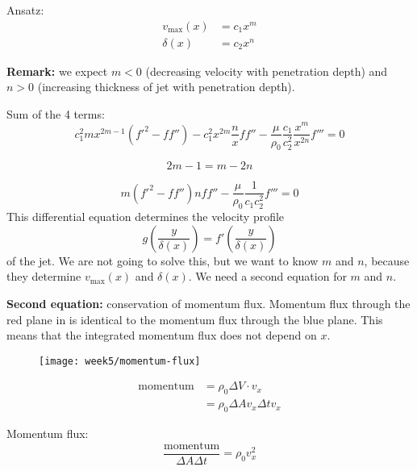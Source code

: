 Ansatz:
\begin{align}
v_\mathrm{max}(x) &= c_1x^m\\
\delta(x) &= c_2 x^n
\end{align}

\begin{framed}
\textbf{Remark:} we expect $m<0$ (decreasing velocity with penetration depth) and $n>0$ (increasing thickness of jet with penetration depth).
\end{framed}

Sum of the 4 terms:
\begin{equation}
c_1^2mx^{2m-1}(f'^2-ff'')-c_1^2x^{2m}\frac{n}{x}ff'' - \frac{\mu}{\rho_0}\frac{c_1}{c_2^2}\frac{x^m}{x^{2n}}f'''=0
\end{equation}

\begin{equation}
2m-1 = m-2n
\end{equation}

\begin{equation}
m(f'^2-ff'')nff''-\frac{\mu}{\rho_0}\frac{1}{c_1c_2^2}f'''=0
\end{equation}
This differential equation determines the velocity profile
\begin{equation}
g\left(\frac{y}{\delta(x)}\right)=f'\left(\frac{y}{\delta(x)}\right)
\end{equation}
of the jet. We are not going to solve this, but we want to know $m$ and $n$, because they determine $v_\mathrm{max}(x)$ and $\delta(x)$. We need a second equation for $m$ and $n$.

\textbf{Second equation:} conservation of momentum flux.
Momentum flux through the red plane in  is identical to the momentum flux through the blue plane. This means that the integrated momentum flux does not depend on $x$.
\begin{figure}[!h]
    \centering
    \texttt{[image: week5/momentum-flux]}\\
    \caption{}
    \label{fig:momentum-flux}
\end{figure}

\begin{align}
\mathrm{momentum} & =\rho_0\Delta V\cdot v_x\\
&= \rho_0\Delta Av_x\Delta tv_x
\end{align}

Momentum flux:
\begin{equation}
\frac{\mathrm{momentum}}{\Delta A \Delta t} = \rho_0 v_x^2
\end{equation}


